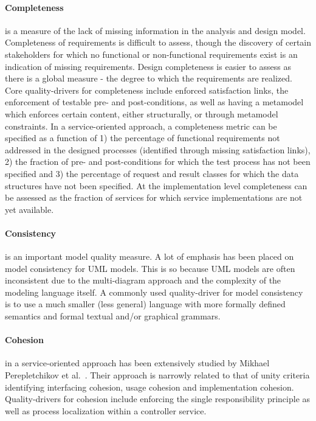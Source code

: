 \paragraph{Completeness} is a measure of the lack of missing information in the analysis and design model. Completeness of requirements is difficult to assess, though the discovery of certain stakeholders for which no functional or non-functional requirements exist is an indication of missing requirements. Design completeness is easier to assess as there is a global measure - the degree to which the requirements are realized. Core quality-drivers for completeness include enforced satisfaction links, the enforcement of testable pre- and post-conditions, as well as having a metamodel which enforces certain content, either structurally, or through metamodel constraints. In a service-oriented approach, a completeness metric can be specified as a function of 1) the percentage of functional requirements not addressed in the designed processes (identified through missing satisfaction links)\cite{shim_design_2008}, 2) the fraction of pre- and post-conditions for which the test process has not been specified and 3) the percentage of request and result classes for which the data structures have not been specified. At the implementation level completeness can be assessed as the fraction of services for which service implementations are not yet available.

\paragraph{Consistency} is an important model quality measure. A lot of emphasis has been placed on model consistency for UML models. This is so because UML models are often inconsistent due to the multi-diagram approach and the complexity of the modeling language itself. A commonly used quality-driver for model consistency is to use a much smaller (less general) language with more formally defined semantics and formal textual and/or graphical grammars. 

\paragraph{Cohesion} in a service-oriented approach has been extensively studied by Mikhael Perepletchikov et al.\ \cite{perepletchikov_cohesion_2007,perepletchikov_impact_2010}. Their approach is narrowly related to that of unity criteria \cite{gonzalez_unity_2009} identifying interfacing cohesion, usage cohesion and implementation cohesion. Quality-drivers for cohesion include enforcing the single responsibility principle as well as process localization within a controller service.

